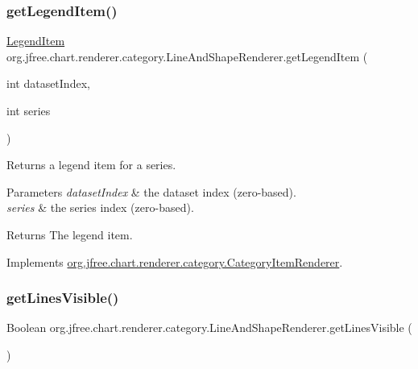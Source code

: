\subsubsection{\texorpdfstring{get\+Legend\+Item()}{getLegendItem()}}
{\footnotesize\ttfamily \mbox{\hyperlink{classorg_1_1jfree_1_1chart_1_1_legend_item}{Legend\+Item}} org.\+jfree.\+chart.\+renderer.\+category.\+Line\+And\+Shape\+Renderer.\+get\+Legend\+Item (\begin{DoxyParamCaption}\item[{int}]{dataset\+Index,  }\item[{int}]{series }\end{DoxyParamCaption})}

Returns a legend item for a series.


\begin{DoxyParams}{Parameters}
{\em dataset\+Index} & the dataset index (zero-\/based). \\
\hline
{\em series} & the series index (zero-\/based).\\
\hline
\end{DoxyParams}
\begin{DoxyReturn}{Returns}
The legend item. 
\end{DoxyReturn}


Implements \mbox{\hyperlink{interfaceorg_1_1jfree_1_1chart_1_1renderer_1_1category_1_1_category_item_renderer_ab9269f34c8b4859211e4f4472636c93c}{org.\+jfree.\+chart.\+renderer.\+category.\+Category\+Item\+Renderer}}.

\mbox{\label{classorg_1_1jfree_1_1chart_1_1renderer_1_1category_1_1_line_and_shape_renderer_aae2830cd3d5576be04342cb538b08c4c}} 
\subsubsection{\texorpdfstring{get\+Lines\+Visible()}{getLinesVisible()}}
{\footnotesize\ttfamily Boolean org.\+jfree.\+chart.\+renderer.\+category.\+Line\+And\+Shape\+Renderer.\+get\+Lines\+Visible (\begin{DoxyParamCaption}{ }\end{DoxyParamCaption})}

